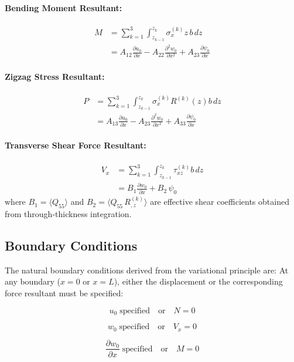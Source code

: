 \documentclass[12pt,a4paper]{report}
\begin{document}
\paragraph{Bending Moment Resultant:}
\begin{align}
M &= \sum_{k=1}^{3} \int_{z_{k-1}}^{z_k} \sigma_x^{(k)} z \, b \, dz \nonumber \\
  &= A_{12} \frac{\partial u_0}{\partial x} 
   - A_{22} \frac{\partial^2 w_0}{\partial x^2} 
   + A_{23} \frac{\partial \psi_0}{\partial x}
\end{align}

\paragraph{Zigzag Stress Resultant:}
\begin{align}
P &= \sum_{k=1}^{3} \int_{z_{k-1}}^{z_k} \sigma_x^{(k)} R^{(k)}(z) b \, dz \nonumber \\
  &= A_{13} \frac{\partial u_0}{\partial x} 
   - A_{23} \frac{\partial^2 w_0}{\partial x^2} 
   + A_{33} \frac{\partial \psi_0}{\partial x}
\end{align}

\paragraph{Transverse Shear Force Resultant:}
\begin{align}
V_x &= \sum_{k=1}^{3} \int_{z_{k-1}}^{z_k} \tau_{xz}^{(k)} b \, dz \nonumber \\
    &= B_{1} \frac{\partial w_0}{\partial x} + B_{2} \, \psi_0
\end{align}
where $B_{1} = \langle Q_{55} \rangle$ and $B_{2} = \langle Q_{55} \, R^{(k)}_{,z} \rangle$ are effective shear coefficients obtained from through-thickness integration.

\subsection*{Boundary Conditions}

The natural boundary conditions derived from the variational principle are:  
At any boundary ($x = 0$ or $x = L$), either the displacement or the corresponding force resultant must be specified:

\[
u_0 \; \text{specified} \quad \text{or} \quad N = 0
\]

\[
w_0 \; \text{specified} \quad \text{or} \quad V_x = 0
\]

\[
\frac{\partial w_0}{\partial x} \; \text{specified} \quad \text{or} \quad M = 0
\]
\end{document}
